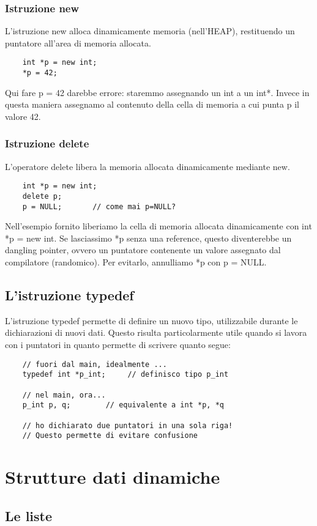 \documentclass[12pt]{article}
\begin{document}
\subsubsection{Istruzione new}
\label{sssec:new_operator}
L'istruzione new alloca dinamicamente memoria (nell'HEAP), restituendo un puntatore all'area di memoria allocata.
\begin{lstlisting}
    int *p = new int;
    *p = 42;
\end{lstlisting}
Qui fare p = 42 darebbe errore: staremmo assegnando un int a un int*. Invece in questa maniera assegnamo al contenuto della cella di memoria a cui punta p il valore 42. 

\subsubsection{Istruzione delete}
\label{sssec:delete_operator}
L'operatore delete libera la memoria allocata dinamicamente mediante new.
\begin{lstlisting}
    int *p = new int;
    delete p;
    p = NULL;       // come mai p=NULL?
\end{lstlisting}
Nell'esempio fornito liberiamo la cella di memoria allocata dinamicamente con int *p = new int. Se lasciassimo *p senza una reference, questo diventerebbe un dangling pointer, ovvero un puntatore contenente un valore assegnato dal compilatore (randomico). Per evitarlo, annulliamo *p con p = NULL. 

\subsection{L'istruzione typedef}
\label{ssec:typedef_instruction}
L'istruzione typedef permette di definire un nuovo tipo, utilizzabile durante le dichiarazioni di nuovi dati. Questo risulta particolarmente utile quando si lavora con i puntatori in quanto permette di scrivere quanto segue:
\begin{lstlisting}
    // fuori dal main, idealmente ...
    typedef int *p_int;     // definisco tipo p_int

    // nel main, ora...
    p_int p, q;        // equivalente a int *p, *q

    // ho dichiarato due puntatori in una sola riga!
    // Questo permette di evitare confusione
\end{lstlisting}

\section{Strutture dati dinamiche}
\label{sec:strutture_dati_dinamiche}

\subsection{Le liste}
\label{ssec:liste}
\end{document}
